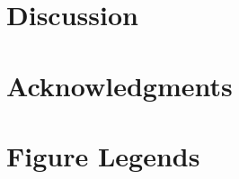 

\section{Discussion}


%

\section{Acknowledgments}




\pagebreak
\section{Figure Legends}


\FloatBarrier

%
%
%
%

